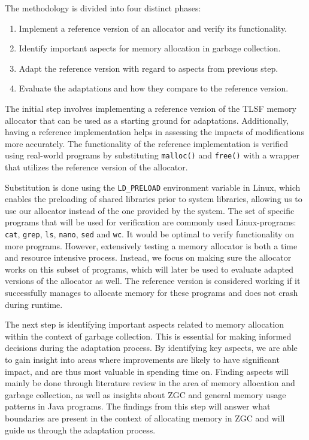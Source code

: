 
The methodology is divided into four distinct phases:

\begin{enumerate}
    \item Implement a reference version of an allocator and verify its functionality.
    \item Identify important aspects for memory allocation in garbage collection.
    \item Adapt the reference version with regard to aspects from previous step.
    \item Evaluate the adaptations and how they compare to the reference version.
\end{enumerate}

The initial step involves implementing a reference version of the TLSF memory allocator that can be used as a starting ground for adaptations. Additionally, having a reference implementation helps in assessing the impacts of modifications more accurately. The functionality of the reference implementation is verified using real-world programs by substituting \texttt{malloc()} and \texttt{free()} with a wrapper that utilizes the reference version of the allocator. 

Substitution is done using the \texttt{LD\_PRELOAD} environment variable in Linux, which enables the preloading of shared libraries prior to system libraries, allowing us to use our allocator instead of the one provided by the system. The set of specific programs that will be used for verification are commonly used Linux-programs: \texttt{cat}, \texttt{grep}, \texttt{ls}, \texttt{nano}, \texttt{sed} and \texttt{wc}. It would be optimal to verify functionality on more programs. However, extensively testing a memory allocator is both a time and resource intensive process. Instead, we focus on making sure the allocator works on this subset of programs, which will later be used to evaluate adapted versions of the allocator as well. The reference version is considered working if it successfully manages to allocate memory for these programs and does not crash during runtime.

The next step is identifying important aspects related to memory allocation within the context of garbage collection. This is essential for making informed decisions during the adaptation process. By identifying key aspects, we are able to gain insight into areas where improvements are likely to have significant impact, and are thus most valuable in spending time on. Finding aspects will mainly be done through literature review in the area of memory allocation and garbage collection, as well as insights about ZGC and general memory usage patterns in Java programs. The findings from this step will answer what boundaries are present in the context of allocating memory in ZGC and will guide us through the adaptation process.

